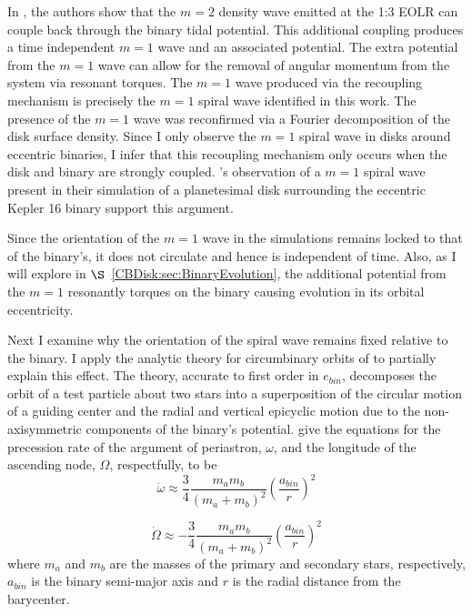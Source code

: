 In \citet{Papaloizou2001}, the authors show that the $m=2$ density wave
emitted at the 1:3 EOLR can couple back through the binary tidal potential. This additional coupling produces a time independent $m = 1$ wave and an associated potential.  The extra potential from the $m = 1$ wave can allow for the removal of angular momentum from the system via resonant torques.  The $m = 1$ wave produced via the recoupling mechanism is precisely the $m = 1$ spiral wave identified in this work.  The presence of the $m = 1$ wave was reconfirmed via a Fourier decomposition of the disk surface density.  Since I only observe the $m = 1$ spiral wave in disks around eccentric binaries, I infer that this recoupling mechanism only occurs when the disk and binary are strongly coupled.  \citet{Lines2016}'s observation of a $m = 1$ spiral wave present in their simulation of a planetesimal disk surrounding the eccentric Kepler 16 binary support this argument.

Since the orientation of the $m = 1$ wave in the simulations remains locked to that of the binary's, it does not circulate and hence is independent of time.  Also, as I will explore in $\S$~\ref{CBDisk:sec:BinaryEvolution}, the additional potential from the $m = 1$ resonantly torques on the binary causing evolution in its orbital eccentricity.  

Next I examine why the orientation of the spiral wave remains fixed relative to the binary.  I apply the analytic theory for circumbinary orbits of \citet{Leung2013} to partially explain this effect.  The theory, accurate to first order in $e_{bin}$, decomposes the orbit of a test particle about two stars into a superposition of the circular motion of a guiding center and the radial and vertical epicyclic motion due to the non-axisymmetric components of the binary's potential.  \citet{Leung2013} give the equations for the precession rate of the argument of periastron, $\omega$, and the longitude of the ascending node, $\Omega$, respectfully, to be
\begin{equation}
\label{CBDisk:eqn:Periastron}
\dot{\omega} \approx \frac{3}{4} \frac{m_a m_b}{(m_a + m_b)^2} \left( \frac{a_{bin}}{r} \right)^2
\end{equation}

\begin{equation}
\label{CBDisk:eqn:Longitude}
\dot{\Omega} \approx -\frac{3}{4} \frac{m_a m_b}{(m_a + m_b)^2} \left( \frac{a_{bin}}{r} \right)^2
\end{equation}
where $m_a$ and $m_b$ are the masses of the primary and secondary stars, respectively, $a_{bin}$ is the binary semi-major
axis and $r$ is the radial distance from the barycenter. 

